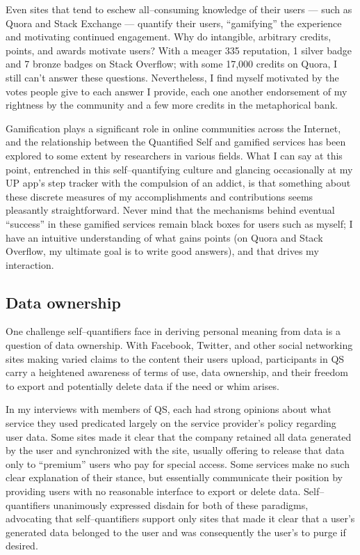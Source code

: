 \documentclass{article}
\begin{document}
Even sites that tend to eschew all--consuming knowledge of their users
--- such as Quora and Stack Exchange ---
quantify their users,
``gamifying'' the experience and motivating continued engagement.
Why do intangible,
arbitrary credits,
points,
and awards motivate users? With a meager 335 reputation,
1 silver badge and 7 bronze badges on Stack Overflow;
with some 17,000 credits on Quora,
I still can't answer these questions.
Nevertheless,
I find myself motivated by the votes people give to each answer I provide,
each one another endorsement of my rightness by the community and a few more credits in the metaphorical bank.

Gamification plays a significant role in online communities across the Internet,
and the relationship between the Quantified Self and gamified services has been explored to some extent by researchers in various fields.
What I can say at this point,
entrenched in this self--quantifying culture and glancing occasionally at my UP app's step tracker with the compulsion of an addict,
is that something about these discrete measures of my accomplishments and contributions seems pleasantly straightforward.
Never mind that the mechanisms behind eventual ``success'' in these gamified services remain black boxes for users such as myself;
I have an intuitive understanding of what gains points (on Quora and Stack Overflow,
my ultimate goal is to write good answers),
and that drives my interaction.

\subsection*{Data ownership}
One challenge self--quantifiers face in deriving personal meaning from data is a question of data ownership.
With Facebook,
Twitter,
and other social networking sites making varied claims to the content their users upload,
participants in QS carry a heightened awareness of terms of use,
data ownership,
and their freedom to export and potentially delete data if the need or whim arises.

In my interviews with members of QS,
each had strong opinions about what service they used predicated largely on the service provider's policy regarding user data.
Some sites made it clear that the company retained all data generated by the user and synchronized with the site,
usually offering to release that data only to ``premium'' users who pay for special access.
Some services make no such clear explanation of their stance,
but essentially communicate their position by providing users with no reasonable interface to export or delete data.
Self--quantifiers unanimously expressed disdain for both of these paradigms,
advocating that self--quantifiers support only sites that made it clear that a user's generated data belonged to the user and was consequently the user's to purge if desired.
\end{document}
